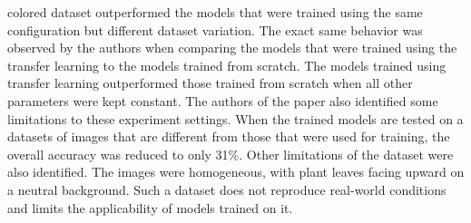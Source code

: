 \documentclass{BachelorBUI}
\begin{document}
colored dataset outperformed the models that were trained using the same configuration but different dataset variation. The exact same behavior was observed by the authors when comparing the models that were trained using the transfer learning to the models trained from scratch. The models trained using transfer learning outperformed those trained from scratch when all other parameters were kept constant. The authors of the paper also identified some limitations to these experiment settings. When the trained models are tested on a datasets of images that are different from those that were used for training, the overall accuracy was reduced to only 31\%. Other limitations of the dataset were also identified. The images were homogeneous, with plant leaves facing upward on a neutral background. Such a dataset does not reproduce real-world conditions and limits the applicability of models trained on it.
\end{document}
